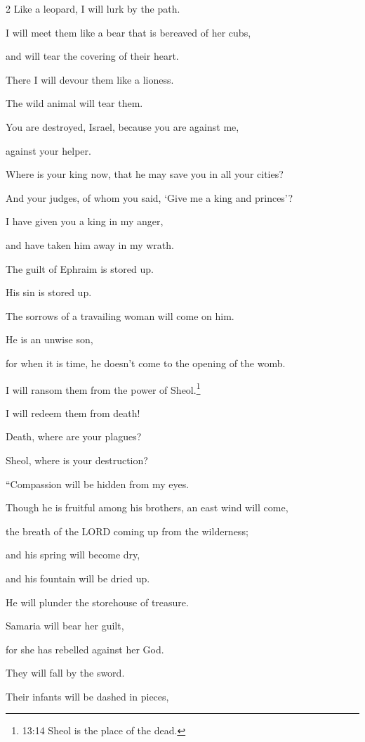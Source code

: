 \begin{multicols}{2}
Like a leopard, I will lurk by the path.

\myverse{}I will meet them like a bear that is bereaved of her cubs,

and will tear the covering of their heart.

There I will devour them like a lioness.

The wild animal will tear them.

\myverse{}You are destroyed, Israel, because you are against me,

against your helper.

\myverse{}Where is your king now, that he may save you in all your cities?

And your judges, of whom you said, ‘Give me a king and princes’?

\myverse{}I have given you a king in my anger,

and have taken him away in my wrath.

\myverse{}The guilt of Ephraim is stored up.

His sin is stored up.

\myverse{}The sorrows of a travailing woman will come on him.

He is an unwise son,

for when it is time, he doesn’t come to the opening of the womb.

\myverse{}I will ransom them from the power of Sheol.\footnote{13:14 Sheol is the place of the dead.}

I will redeem them from death!

Death, where are your plagues?

Sheol, where is your destruction?

\vspace{\baselineskip} 
“Compassion will be hidden from my eyes.

\myverse{}Though he is fruitful among his brothers, an east
wind will come,

the breath of the LORD coming up from the wilderness;

and his spring will become dry,

and his fountain will be dried up.

He will plunder the storehouse of treasure.

\myverse{}Samaria will bear her guilt,

for she has rebelled against her God.

They will fall by the sword.

Their infants will be dashed in pieces,


\end{multicols}
